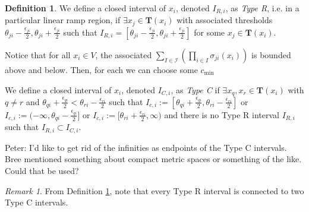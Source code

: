 \documentclass[12pt]{article}
\theoremstyle{definition}
\newtheorem{defn}{Definition}[section]
\theoremstyle{remark}
\newtheorem{remark}{Remark}[section]
\begin{document}
\begin{defn}	\label{IntervalType}
We define a closed interval of $x_i$, denoted $I_{R,i}$, as \textit{Type R}, i.e. in a particular linear ramp region, if $\exists x_j\in\mathbf{T}(x_i)$ with associated thresholds $\theta_{ji}-\frac{\epsilon_{ji}}{2},\theta_{ji}+\frac{\epsilon_{ji}}{2}$ such that $I_{R,i}=\left[\theta_{ji}-\frac{\epsilon_{ji}}{2},\theta_{ji}+\frac{\epsilon_{ji}}{2}\right]$ for some $x_j \in \mathbf{T}(x_i)$.

Notice that for all $x_i\in V$, the associated $\sum_{I\in \mathcal{I}}\left(\prod_{i\in I}\sigma_{ji}(x_i)\right)$ is bounded above and below. Then, for each  we can choose some $c_\text{min}$


We define a closed interval of $x_i$, denoted $I_{C,i}$, as \textit{Type C} if $\exists x_q,x_r \in \mathbf{T}(x_i)$ with $q\neq r$ and $\theta_{qi}+\frac{\epsilon_{qi}}{2}<\theta_{ri}-\frac{\epsilon_{ri}}{2}$ such that $I_{c,i}:=[\theta_{qi}+\frac{\epsilon_{qi}}{2},\theta_{ri}-\frac{\epsilon_{ri}}{2}]$ or $I_{c,i}:=(-\infty,\theta_{qi}-\frac{\epsilon_{qi}}{2}]$ or $I_{c,i}:=[\theta_{ri}+\frac{\epsilon_{ri}}{2},\infty)$ and there is no Type R interval $I_{R,i}$ such that $I_{R,i}\subset I_{C,i}$. 
\end{defn}

{\color{cyan} Peter: I'd like to get rid of the infinities as endpoints of the Type C intervals. Bree mentioned something about compact metric spaces or something of the like. Could that be used?}

\begin{remark}
From Definition \ref{IntervalType}, note that every Type R interval is connected to two Type C intervals.
\end{remark}
\end{document}
